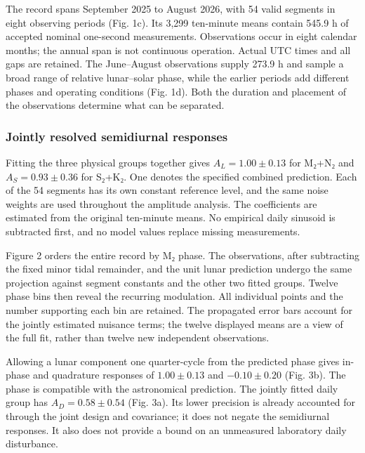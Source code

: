 \documentclass[
  10pt,
  a4paper,
]{article}
\begin{document}
The record spans September 2025 to August 2026, with 54 valid segments
in eight observing periods (Fig. 1c). Its 3,299 ten-minute means contain
545.9 h of accepted nominal one-second measurements. Observations occur
in eight calendar months; the annual span is not continuous operation.
Actual UTC times and all gaps are retained. The June--August
observations supply 273.9 h and sample a broad range of relative
lunar--solar phase, while the earlier periods add different phases and
operating conditions (Fig. 1d). Both the duration and placement of the
observations determine what can be separated.

\hypertarget{jointly-resolved-semidiurnal-responses}{%
\subsubsection{Jointly resolved semidiurnal
responses}\label{jointly-resolved-semidiurnal-responses}}

Fitting the three physical groups together gives \(A_L=1.00\pm0.13\) for
M₂+N₂ and \(A_S=0.93\pm0.36\) for S₂+K₂. One denotes the specified
combined prediction. Each of the 54 segments has its own constant
reference level, and the same noise weights are used throughout the
amplitude analysis. The coefficients are estimated from the original
ten-minute means. No empirical daily sinusoid is subtracted first, and
no model values replace missing measurements.

Figure 2 orders the entire record by M₂ phase. The observations, after
subtracting the fixed minor tidal remainder, and the unit lunar
prediction undergo the same projection against segment constants and the
other two fitted groups. Twelve phase bins then reveal the recurring
modulation. All individual points and the number supporting each bin are
retained. The propagated error bars account for the jointly estimated
nuisance terms; the twelve displayed means are a view of the full fit,
rather than twelve new independent observations.

Allowing a lunar component one quarter-cycle from the predicted phase
gives in-phase and quadrature responses of \(1.00\pm0.13\) and
\(-0.10\pm0.20\) (Fig. 3b). The phase is compatible with the
astronomical prediction. The jointly fitted daily group has
\(A_D=0.58\pm0.54\) (Fig. 3a). Its lower precision is already accounted
for through the joint design and covariance; it does not negate the
semidiurnal responses. It also does not provide a bound on an unmeasured
laboratory daily disturbance.
\end{document}
